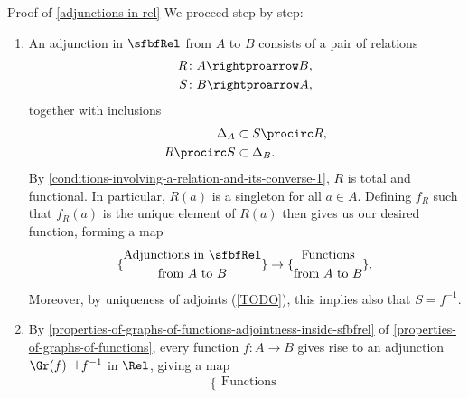 \begin{Proof}{Proof of \cref{adjunctions-in-rel}}%
    We proceed step by step:
    \begin{enumerate}
        \item\label{proof-of-adjunctions-in-rel-1}An adjunction in $\sfbfRel$ from $A$ to $B$ consists of a pair of relations
            \begin{align*}
                R &\colon A\rightproarrow B,\\
                S &\colon B\rightproarrow A,
            \end{align*}
            together with inclusions
            \begin{align*}
                \Delta_{A}  &\subset S\procirc R,\\
                R\procirc S &\subset \Delta_{B}.
            \end{align*}
            By \cref{conditions-involving-a-relation-and-its-converse-1}, $R$ is total and functional. In particular, $R(a)$ is a singleton for all $a\in A$. Defining $f_{R}$ such that $f_{R}(a)$ is the unique element of $R(a)$ then gives us our desired function, forming a map
            \[
                \{
                    \begin{gathered}
                        \text{Adjunctions in $\sfbfRel$}\\
                        \text{from $A$ to $B$}
                    \end{gathered}
                \}%
                \to
                \{
                    \begin{gathered}
                        \text{Functions}\\
                        \text{from $A$ to $B$}
                    \end{gathered}
                \}.
            \]%
            Moreover, by uniqueness of adjoints (\cref{TODO}), this implies also that $S=f^{-1}$.
        \item\label{proof-of-adjunctions-in-rel-2}By \cref{properties-of-graphs-of-functions-adjointness-inside-sfbfrel} of \cref{properties-of-graphs-of-functions}, every function $f\colon A\to B$ gives rise to an adjunction $\Gr(f)\dashv f^{-1}$ in $\Rel$, giving a map
            \[
                \{
                    \begin{gathered}
                        \text{Functions}\\

\end{gathered}\]
\end{enumerate}
\end{Proof}

